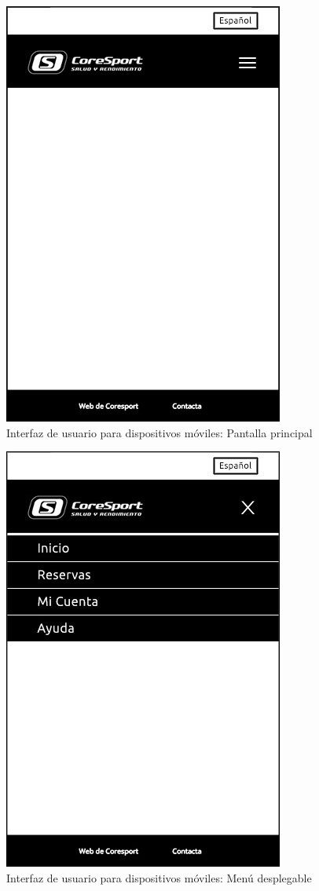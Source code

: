 \begin{figure}[H]
\centering
  \includegraphics[scale=.50]{img/interfaz/pantalla-principal-movil.jpg}
  \caption{Interfaz de usuario para dispositivos móviles: Pantalla principal}
  \label{fig:interfaz-pantalla-principal-movil}
\end{figure}

\begin{figure}[H]
\centering
  \includegraphics[scale=.50]{img/interfaz/menu-movil.jpg}
  \caption{Interfaz de usuario para dispositivos móviles: Menú desplegable}
  \label{fig:interfaz-menu-movil}
\end{figure}


